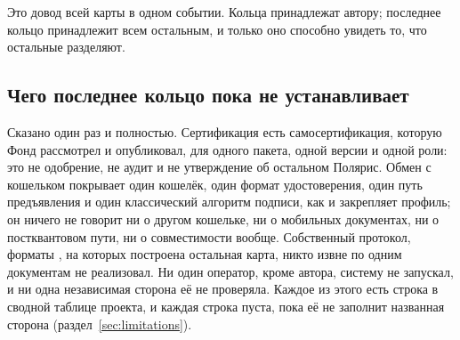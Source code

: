 Это довод всей карты в одном событии. Кольца принадлежат автору; последнее кольцо принадлежит всем
остальным, и только оно способно увидеть то, что остальные разделяют.

\subsection{Чего последнее кольцо пока не устанавливает}

Сказано один раз и полностью. Сертификация есть самосертификация, которую Фонд рассмотрел и опубликовал,
для одного пакета, одной версии и одной роли: это не одобрение, не аудит и не утверждение об остальном
Полярис. Обмен с кошельком покрывает один кошелёк, один формат удостоверения, один путь предъявления и
один классический алгоритм подписи, как и закрепляет профиль; он ничего не говорит ни о другом
кошельке, ни о мобильных документах, ни о постквантовом пути, ни о совместимости вообще. Собственный
протокол, форматы , на которых построена остальная карта, никто извне по одним
документам не реализовал. Ни один оператор, кроме автора, систему не запускал, и ни одна независимая
сторона её не проверяла. Каждое из этого есть строка в сводной таблице проекта, и каждая строка пуста,
пока её не заполнит названная сторона (раздел~\ref{sec:limitations}). \sExt
